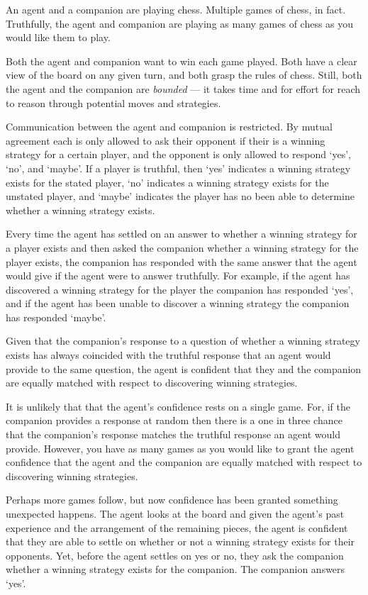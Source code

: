 \documentclass[10pt]{article}
\begin{document}
\begin{scenario}[Chess]\label{scen:chess}
  An agent and a companion are playing chess.
  Multiple games of chess, in fact.
  Truthfully, the agent and companion are playing as many games of chess as you would like them to play.

  Both the agent and companion want to win each game played.
  Both have a clear view of the board on any given turn, and both grasp the rules of chess.
  Still, both the agent and the companion are \emph{bounded} --- it takes time and for effort for reach to reason through potential moves and strategies.

  Communication between the agent and companion is restricted.
  By mutual agreement each is only allowed to ask their opponent if their is a winning strategy for a certain player, and the opponent is only allowed to respond `yes', `no', and `maybe'.
  If a player is truthful, then `yes' indicates a winning strategy exists for the stated player, `no' indicates a winning strategy exists for the unstated player, and `maybe' indicates the player has no been able to determine whether a winning strategy exists.

  Every time the agent has settled on an answer to whether a winning strategy for a player exists and then asked the companion whether a winning strategy for the player exists, the companion has responded with the same answer that the agent would give if the agent were to answer truthfully.
  For example, if the agent has discovered a winning strategy for the player the companion has responded `yes', and if the agent has been unable to discover a winning strategy the companion has responded `maybe'.

  Given that the companion's response to a question of whether a winning strategy exists has always coincided with the truthful response that an agent would provide to the same question, the agent is confident that they and the companion are equally matched with respect to discovering winning strategies.

  It is unlikely that that the agent's confidence rests on a single game.
  For, if the companion provides a response at random then there is a one in three chance that the companion's response matches the truthful response an agent would provide.
  However, you have as many games as you would like to grant the agent confidence that the agent and the companion are equally matched with respect to discovering winning strategies.

  Perhaps more games follow, but now confidence has been granted something unexpected happens.
  The agent looks at the board and given the agent's past experience and the arrangement of the remaining pieces, the agent is confident that they are able to settle on whether or not a winning strategy exists for their opponents.
  Yet, before the agent settles on yes or no, they ask the companion whether a winning strategy exists for the companion.
  The companion answers `yes'.


\end{scenario}
\end{document}
